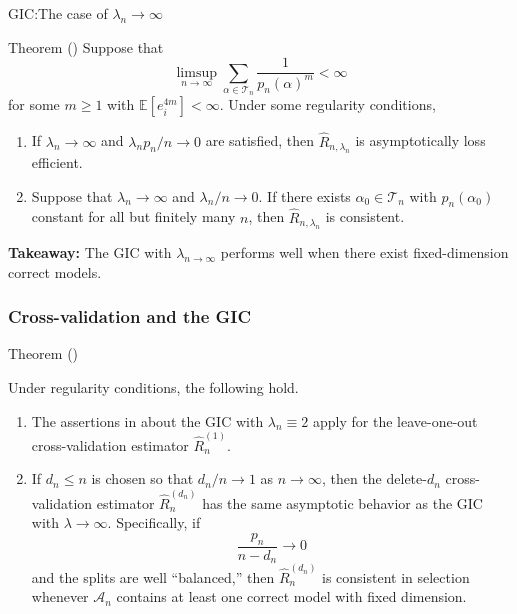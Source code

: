 \documentclass{beamer}
\newcommand{\0}{\emptyset}
\newcommand{\Ep}[1]{\mathbb{E}\left[ #1 \right]}
\newcommand{\Acal}{\mathcal{A}_{n}}
\newcommand{\Tcal}{\mathcal{T}_{n}}
\newcommand{\1}{\mathmybb{1}}
\begin{document}
\begin{frame}{GIC:\@ The case of \(\lambda_{n} \to \infty\)}
    \begin{block}{Theorem (\cite{shao_1997})}\label{thm:97thm2}
        Suppose that
        \begin{equation}\label{eq:310}
            \limsup_{n\to\infty}\sum_{\alpha\in\Tcal}\frac{1}{p_{n}{(\alpha)}^{m}}<\infty
        \end{equation}
        for some \(m\geq1\) with \(\Ep{e_{i}^{4m}}<\infty\). Under some regularity conditions,
        \begin{enumerate}
            \item If \(\lambda_{n}\to\infty\) and \(\lambda_{n}p_{n}/n \to 0\) are satisfied, then \(\hat{R}_{n,\lambda_{n}}\) is asymptotically loss efficient.
            \item Suppose that \(\lambda_{n}\to\infty\) and \(\lambda_{n}/n\to 0\). If there exists \(\alpha_{0}\in\Tcal\) with \(p_{n}(\alpha_{0})\) constant for all but finitely many \(n\), then \(\hat{R}_{n,\lambda_{n}}\) is consistent. 
        \end{enumerate}
    \end{block}
    \textbf{Takeaway: }The GIC with \(\lambda_{n\to\infty}\) performs well when there exist fixed-dimension correct models.
\end{frame}

\begin{frame}
    \frametitle{Cross-validation and the GIC}
    \begin{alertblock}{Theorem (\cite{shao_1997})}
        
        Under regularity conditions, the following hold.
        
        \begin{enumerate}
        \item The assertions in about the GIC with \(\lambda_{n}\equiv 2\) apply for the leave-one-out cross-validation estimator \(\hat{R}_{n}^{(1)}\).
        \item If \(d_{n}\leq n\) is chosen so that \(d_{n}/n\to1\) as \(n\to\infty\), then the delete-\(d_{n}\) cross-validation estimator \(\hat{R}_{n}^{(d_{n})}\) has the same asymptotic behavior as the GIC with \(\lambda\to\infty\). Specifically, if \[\frac{p_{n}}{n-d_{n}}\to 0\] and the splits are well ``balanced,'' then \(\hat{R}_{n}^{(d_{n})}\) is consistent in selection whenever \(\Acal\) contains at least one correct model with fixed dimension.
        \end{enumerate}
    \end{alertblock}
    
\end{frame}
\end{document}
